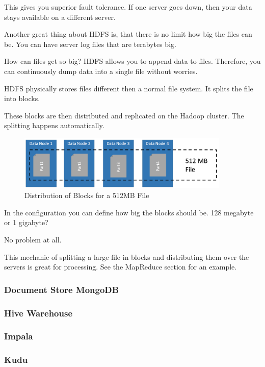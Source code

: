 \documentclass[12pt]{scrartcl} %
\begin{document}
This gives you superior fault tolerance. If one server goes down, then your data stays available on a different server.

Another great thing about HDFS is, that there is no limit how big the files can be. You can have server log files that are terabytes big.

How can files get so big? HDFS allows you to append data to files. Therefore, you can continuously dump data into a single file without worries.

HDFS physically stores files different then a normal file system. It splits the file into blocks.

These blocks are then distributed and replicated on the Hadoop cluster. The splitting happens automatically.

\begin{figure}[htbp] 
  \centering
     \includegraphics[width=0.9\textwidth]{images/HDFS-Distributed-FileSystem}
  \caption{Distribution of Blocks for a 512MB File}
  \label{fig:Bild1}
\end{figure}

In the configuration you can define how big the blocks should be. 128 megabyte or 1 gigabyte?

No problem at all.

This mechanic of splitting a large file in blocks and distributing them over the servers is great for processing.
See the MapReduce section for an example.

\subsubsection{Document Store MongoDB}
\subsubsection{Hive Warehouse}
\subsubsection{Impala}
\subsubsection{Kudu}
\end{document}
